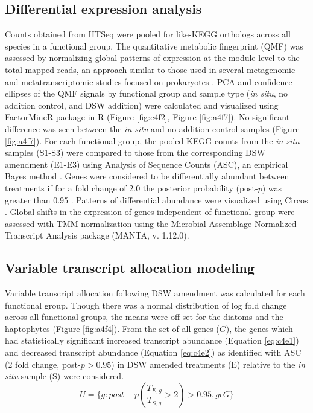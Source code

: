 \subsection{Differential expression analysis}
Counts obtained from HTSeq were pooled for like-KEGG orthologs across all species in a functional group. The quantitative metabolic fingerprint (QMF) was assessed by normalizing global patterns of expression at the module-level to the total mapped reads, an approach similar to those used in several metagenomic and metatranscriptomic studies focused on prokaryotes \citep{Shi2011, Ottesen2014, Shi2012}. PCA and confidence ellipses of the QMF signals by functional group and sample type (\textit{in situ}, no addition control, and DSW addition) were calculated and visualized using FactorMineR package in R (Figure \ref{fig:c4f2}, Figure \ref{fig:a4f7}). No significant difference was seen between the \textit{in situ} and no addition control samples (Figure \ref{fig:a4f7}). For each functional group, the pooled KEGG counts from the \textit{in situ} samples (S1-S3) were compared to those from the corresponding DSW amendment (E1-E3) using Analysis of Sequence Counts (ASC), an empirical Bayes method \citep{Wu2010}. Genes were considered to be differentially abundant between treatments if for a fold change of 2.0 the posterior probability (post-$p$) was greater than 0.95 \citep{Dyhrman2012}. Patterns of differential abundance were visualized using Circos \citep{Krzywinski2009}. Global shifts in the expression of genes independent of functional group were assessed with TMM normalization using the Microbial Assemblage Normalized Transcript Analysis package (MANTA, v. 1.12.0)\citep{Marchetti2012a}. \par
\subsection{Variable transcript allocation modeling} 
Variable transcript allocation following DSW amendment was calculated for each functional group. Though there was a normal distribution of log fold change across all functional groups, the means were off-set for the diatoms and the haptophytes (Figure \ref{fig:a4f4}). From the set of all genes ($G$), the genes which had statistically significant increased transcript abundance (Equation \ref{eq:c4e1}) and decreased transcript abundance (Equation \ref{eq:c4e2}) as identified with ASC (2 fold change, post-$p > 0.95$) \citep{Wu2010} in DSW amended treatments (E) relative to the \textit{in situ} sample (S) were considered. 
\begin{equation}
	\label{eq:c4e1}
	 U = \{g : post-p(\frac{T_{E,g}}{T_{S,g}} > 2) > 0.95, g \epsilon G\}
\end{equation}

